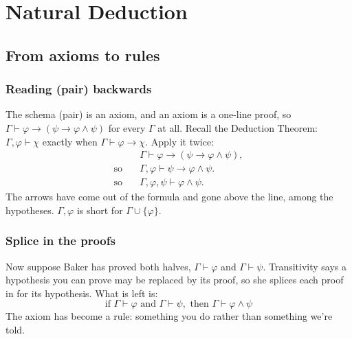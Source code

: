 \documentclass[a4paper, 11pt]{article}
\theoremstyle{definition}
\begin{document}
\section{Natural Deduction}

\subsection{From axioms to rules}

\subsubsection{Reading (pair) backwards}
The schema (pair) is an axiom, and an axiom is a one-line proof, so $\Gamma \vdash \varphi \to (\psi \to \varphi \land \psi)$
for every $\Gamma$ at all. Recall the Deduction Theorem: $\Gamma, \varphi \vdash \chi$ exactly when $\Gamma \vdash \varphi \to \chi$.
Apply it twice:
\begin{align*}
                & \Gamma \vdash \varphi \to (\psi \to \varphi \land \psi), \\
    \text{so}\quad & \Gamma, \varphi \vdash \psi \to \varphi \land \psi. \\
    \text{so}\quad & \Gamma, \varphi, \psi \vdash \varphi \land \psi. 
\end{align*}
The arrows have come out of the formula and gone above the line, among the hypotheses. $\Gamma, \varphi$ is short for
$\Gamma \cup \{\varphi\}$.

\subsubsection{Splice in the proofs}
Now suppose Baker has proved both halves, $\Gamma \vdash \varphi$ and $\Gamma \vdash \psi$. Transitivity says a hypothesis
you can prove may be replaced by its proof, so she splices each proof in for its hypothesis. What is left is:
\[\text{if } \Gamma \vdash \varphi \text{ and } \Gamma \vdash \psi, \text{ then } \Gamma \vdash \varphi \land \psi\]
The axiom has become a rule: something you do rather than something we're told.
\end{document}
